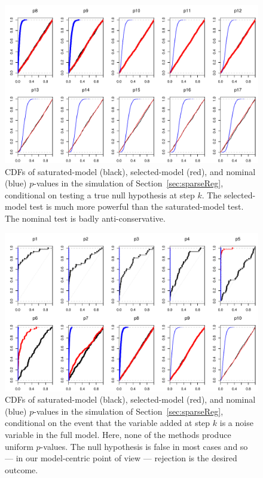 \documentclass{article}
\begin{document}
\begin{figure}
  \centering
  \includegraphics[width=.8\textwidth]{figs/simulation_snr_5_alpha_05_null_true.pdf}
  \caption{CDFs of saturated-model (black), selected-model (red), and nominal (blue) $p$-values in the simulation of Section~\ref{sec:sparseReg}, conditional on testing a true null hypothesis at step $k$. The selected-model test is much more powerful than the saturated-model test. The nominal test is badly anti-conservative.}
  \label{fig:simulation_null_true}
\end{figure}

\begin{figure}
  \centering
  \includegraphics[width=.8\textwidth]{figs/simulation_snr_5_alpha_05_noise_var.pdf}
  \caption{CDFs of saturated-model (black), selected-model (red), and nominal (blue) $p$-values in the simulation of Section~\ref{sec:sparseReg}, conditional on the event that the variable added at step $k$ is a noise variable in the full model. Here, none of the methods produce uniform $p$-values. The null hypothesis is false in most cases and so --- in our model-centric point of view --- rejection is the desired outcome.}
  \label{fig:simulation_noise_var}
\end{figure}
\end{document}
